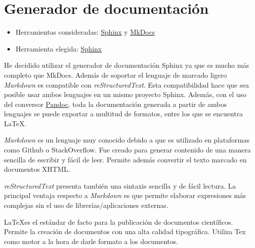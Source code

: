 \section{Generador de documentación}\label{gen-doc}

\begin{itemize}
\tightlist
	\item Herramientas consideradas:
  		\href{https://www.sphinx-doc.org/es/master/index.html}{Sphinx} y
  		\href{https://www.mkdocs.org/} {MkDocs}
	\item Herramienta elegida:
  		\href{https://www.sphinx-doc.org/es/master/index.html}{Sphinx}
\end{itemize}

He decidido utilizar el generador de documentación Sphinx ya que es mucho más completo que MkDocs. Además de soportar el lenguaje de marcado ligero \emph{Markdown} es compatible con \emph{reStructuredText}. Esta compatibilidad hace que sea posible usar ambos lenguajes en un mismo proyecto Sphinx. Además, con el uso del conversor \href{http://pandoc.org/}{Pandoc}, toda la documentación generada a partir de ambos lenguajes se puede exportar a multitud de formatos, entre los que se encuentra \LaTeX.

\emph{Markdown} es un lenguaje muy conocido debido a que es utilizado en plataformas como Github o StackOverflow. Fue creado para generar contenido de una manera sencilla de escribir y fácil de leer. Permite además convertir el texto marcado en documentos XHTML.

\emph{reStructuredText} presenta también una sintaxis sencilla y de fácil lectura. La principal ventaja respecto a \emph{Markdown} es que permite elaborar expresiones más complejas sin el uso de librerías/aplicaciones externas.

\LaTeX es el estándar de facto para la publicación de documentos científicos. Permite la creación de documentos con una alta calidad tipográfica. Utiliza Tex como motor a la hora de darle formato a los documentos.